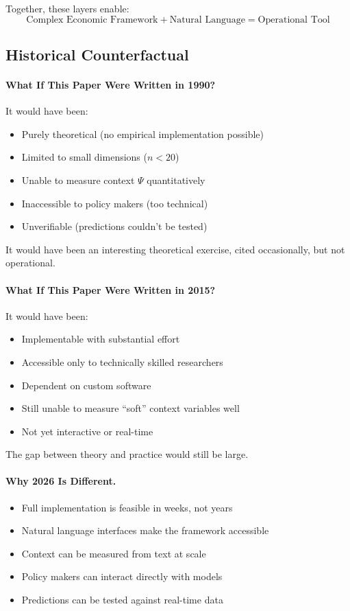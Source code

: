 \documentclass[12pt,a4paper]{article}
\begin{document}
Together, these layers enable:
\begin{equation}
  \text{Complex Economic Framework} + \text{Natural Language} = \text{Operational Tool}
\end{equation}

\subsection{Historical Counterfactual}

\paragraph{What If This Paper Were Written in 1990?}
It would have been:
\begin{itemize}
  \item Purely theoretical (no empirical implementation possible)
  \item Limited to small dimensions ($n < 20$)
  \item Unable to measure context $\Psi$ quantitatively
  \item Inaccessible to policy makers (too technical)
  \item Unverifiable (predictions couldn't be tested)
\end{itemize}

It would have been an interesting theoretical exercise, 
cited occasionally, but not operational.

\paragraph{What If This Paper Were Written in 2015?}
It would have been:
\begin{itemize}
  \item Implementable with substantial effort
  \item Accessible only to technically skilled researchers
  \item Dependent on custom software
  \item Still unable to measure ``soft'' context variables well
  \item Not yet interactive or real-time
\end{itemize}

The gap between theory and practice would still be large.

\paragraph{Why 2026 Is Different.}
\begin{itemize}
  \item Full implementation is feasible in weeks, not years
  \item Natural language interfaces make the framework accessible
  \item Context can be measured from text at scale
  \item Policy makers can interact directly with models
  \item Predictions can be tested against real-time data
\end{itemize}
\end{document}
